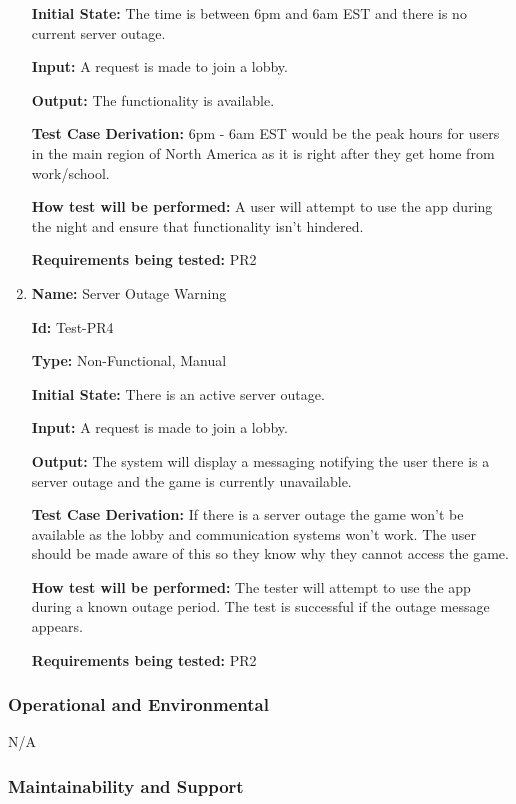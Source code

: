 \documentclass[12pt, titlepage]{article}
\begin{document}
\begin{enumerate}
\textbf{Initial State:} The time is between 6pm and 6am EST and there is no current server outage. 
					
\textbf{Input:} A request is made to join a lobby.  
					
\textbf{Output:} The functionality is available. 

\textbf{Test Case Derivation:} 6pm - 6am EST would be the peak hours for users in the main region of North America as it is right after they get home from work/school. 
					
\textbf{How test will be performed:} A user will attempt to use the app during the night and ensure that functionality isn't hindered. 

\textbf{Requirements being tested:} PR2

\item{\textbf{Name:} Server Outage Warning}

\textbf{Id:} Test-PR4

\textbf{Type:} Non-Functional, Manual
					
\textbf{Initial State:} There is an active server outage. 
					
\textbf{Input:} A request is made to join a lobby.  
					
\textbf{Output:} The system will display a messaging notifying the user there is a server outage and the game is currently unavailable. 

\textbf{Test Case Derivation:} If there is a server outage the game won't be available as the lobby and communication systems won't work. The user should be made aware of this so they know why they cannot access the game.
					
\textbf{How test will be performed:} The tester will attempt to use the app during a known outage period. The test is successful if the outage message appears.

\textbf{Requirements being tested:} PR2

\end{enumerate}

\subsubsection{Operational and Environmental}

N/A

\subsubsection{Maintainability and Support}
\end{document}
